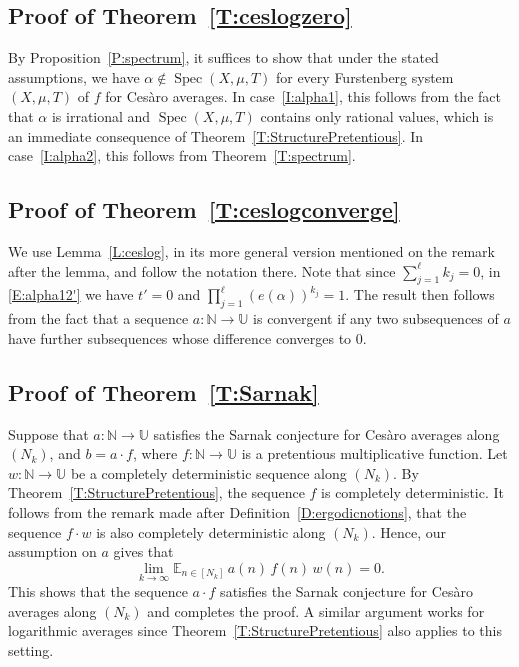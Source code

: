 \documentclass[11pt]{amsart}
\theoremstyle{definition}
\newcommand{\E}{{\mathbb E}}
\newcommand{\N}{{\mathbb N}}
\newcommand{\U}{{\mathbb U}}
\DeclareMathOperator{\spec}{Spec}
\begin{document}
 \subsection{Proof of Theorem~\ref{T:ceslogzero}}\label{SS:ceslogzero}
 By Proposition~\ref{P:spectrum}, it suffices to show that under the stated assumptions, we have  $\alpha \not\in \spec(X,\mu,T)$ for every Furstenberg system $(X,\mu,T)$ of $f$ for Ces\`aro averages.  In case~\eqref{I:alpha1}, this follows from the fact that $\alpha$ is irrational and  $\spec(X,\mu,T)$ contains only rational values, which is an immediate consequence of  Theorem~\ref{T:StructurePretentious}. In case~\eqref{I:alpha2}, this follows  from Theorem~\ref{T:spectrum}. %

\subsection{Proof of Theorem~\ref{T:ceslogconverge}}\label{SS:ceslogconverge}
We use Lemma~\ref{L:ceslog}, in its more general version mentioned on the remark
after the lemma, and  follow the notation there.
	Note that since $\sum_{j=1}^\ell k_j=0$,  in \eqref{E:alpha12'} we have $t'=0$ and  $\prod_{j=1}^\ell(e(\alpha))^{k_j}=1$. The result then follows from the fact that a sequence $a\colon \N\to \U$ is convergent if  any two subsequences of $a$ have further subsequences whose difference converges to $0$.
 \subsection{Proof of Theorem~\ref{T:Sarnak}}\label{SS:Sarnak}
Suppose that $a\colon \N\to \U$  satisfies the Sarnak conjecture for Ces\`aro averages along $(N_k)$,
and $b=a \cdot f$, where $f\colon \N\to \U$ is a  pretentious multiplicative function.
Let $w\colon \N \to \U$ be a completely deterministic  sequence along $(N_k)$.
By Theorem~\ref{T:StructurePretentious}, the sequence $f$ is completely deterministic. It follows from the remark
made after Definition~\ref{D:ergodicnotions}, that the sequence $f\cdot w$ is also completely deterministic along $(N_k)$. Hence, our assumption on $a$ gives that
$$
\lim_{k\to\infty}\E_{n\in[N_k]} \, a(n)\, f(n)\, w(n)=0.
$$
This shows that the sequence $a\cdot f$ satisfies the Sarnak conjecture for Ces\`aro averages along $(N_k)$
and completes the proof.
A similar argument works for logarithmic averages since Theorem~\ref{T:StructurePretentious}  also applies to this setting.
\end{document}
